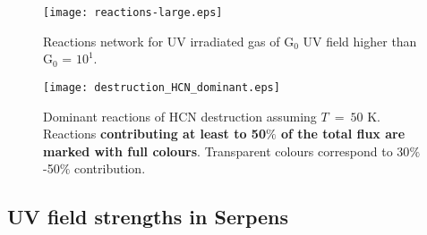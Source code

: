 \documentclass{aa}
\begin{document}
\begin{figure} 
\texttt{[image: reactions-large.eps]} 
\caption{Reactions network for UV irradiated gas of G$_0$ UV field higher than G$_0$ = $10^{1}$.}
\label{reactions_largeG0} 
\end{figure}
\begin{figure} 
\texttt{[image: destruction\_HCN\_dominant.eps]} 
\caption{Dominant reactions
of HCN destruction assuming $T~=~50$ K. Reactions \textbf{contributing at least to 50$\%$ of the total flux are marked with full colours}.
Transparent colours correspond to 30$\%$-50$\%$ contribution.} 
\label{HCN_dest} 
\end{figure}
\subsection{UV field strengths in Serpens}
\label{subsection:UV}
\end{document}
